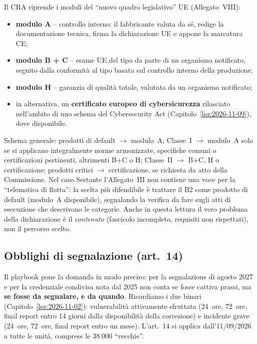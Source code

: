 \begin{integrazione}
Il CRA riprende i moduli del ``nuovo quadro legislativo'' UE (Allegato~VIII):
\begin{itemize}
  \item \textbf{modulo A} -- controllo interno: il fabbricante valuta da sé, redige la documentazione
    tecnica, firma la dichiarazione UE e appone la marcatura CE;
  \item \textbf{modulo B + C} -- esame UE del tipo da parte di un organismo notificato, seguito dalla
    conformità al tipo basata sul controllo interno della produzione;
  \item \textbf{modulo H} -- garanzia di qualità totale, valutata da un organismo notificato;
  \item in alternativa, un \textbf{certificato europeo di cybersicurezza} rilasciato nell'ambito di uno
    schema del Cybersecurity Act (Capitolo~\ref{lez:2026-11-09}), dove disponibile.
\end{itemize}
Schema generale: prodotti di default $\to$ modulo~A; Classe~I $\to$ modulo~A solo se si applicano
integralmente norme armonizzate, specifiche comuni o certificazioni pertinenti, altrimenti B+C o H;
Classe~II $\to$ B+C, H o certificazione; prodotti critici $\to$ certificazione, se richiesta da atto
della Commissione. Nel caso Sestante l'Allegato~III non contiene una voce per la ``telematica di
flotta'': la scelta più difendibile è trattare il B2 come prodotto di default (modulo~A disponibile),
segnalando la verifica da fare sugli atti di esecuzione che descrivono le categorie. Anche in questa
lettura il vero problema della dichiarazione è il \emph{contenuto} (fascicolo incompleto, requisiti
non rispettati), non il percorso scelto.
\end{integrazione}

\subsection{Obblighi di segnalazione (art.~14)}
Il playbook pone la domanda in modo preciso: per la segnalazione di agosto 2027 e per la credenziale
condivisa nota dal 2025 non conta se fosse cattiva prassi, ma \textbf{se fosse da segnalare, e da
quando}. Ricordiamo i due binari (Capitolo~\ref{lez:2026-11-02}): vulnerabilità attivamente sfruttata
(24~ore, 72~ore, final report entro 14 giorni dalla disponibilità della correzione) e incidente grave
(24~ore, 72~ore, final report entro un mese). L'art.~14 si applica dall'11/09/2026 a tutte le unità,
comprese le 38.000 ``vecchie''.

